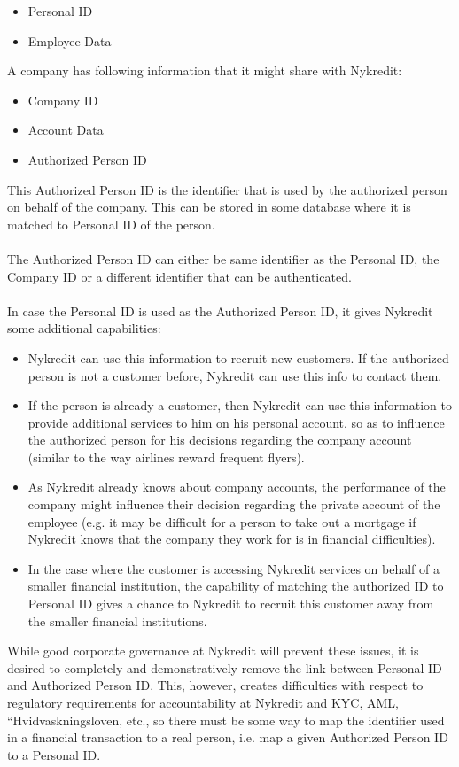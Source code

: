 \begin{itemize}
	\item Personal ID
	\item Employee Data
\end{itemize}
A company has following information that it might share with Nykredit:
\begin{itemize}
	\item Company ID	
	\item Account Data
	\item Authorized Person ID
\end{itemize}
This Authorized Person ID is the identifier that is used by the authorized person on behalf of the company. This can be stored in some database where it is matched to Personal ID of the person.
\\
\\The Authorized Person ID can either be same identifier as the Personal ID, the Company ID or a different identifier that can be authenticated. 
\\
\\In case the Personal ID is used as the Authorized Person ID, it gives Nykredit some additional capabilities:
\begin{itemize}
\item Nykredit can use this information to recruit new customers. If the authorized person is not a customer before, Nykredit can use this info to contact them.
\item If the person is already a customer, then Nykredit can use this information to provide additional services to him on his personal account, so as to influence the authorized person for his decisions regarding the company account (similar to the way airlines reward frequent flyers).
\item As Nykredit already knows about company accounts, the performance of the company might influence their decision regarding the private account of the employee (e.g. it may be difficult for a person to take out a mortgage if Nykredit knows that the company they work for is in financial difficulties).
\item In the case where the customer is accessing Nykredit services on behalf of a smaller financial institution, the capability of matching the authorized ID to Personal ID gives a chance to Nykredit to recruit this customer away from the smaller financial institutions.
\end{itemize}
While good corporate governance at Nykredit will prevent these issues, it is desired to completely and demonstratively remove the link between Personal ID and Authorized Person ID. This, however, creates difficulties with respect to regulatory requirements for accountability at Nykredit and KYC, AML, “Hvidvaskningsloven, etc., so there must be some way to map the identifier used in a financial transaction to a real person, i.e. map a given Authorized Person ID to a Personal ID.

